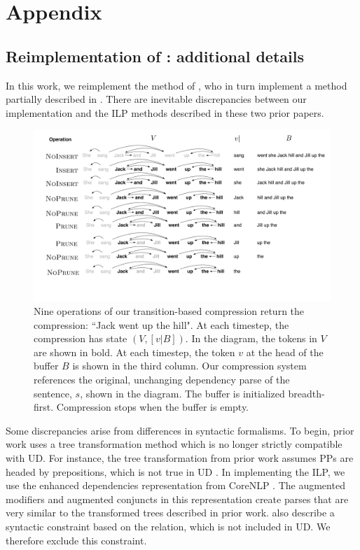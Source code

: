 
\section{Appendix}


\subsection{Reimplementation of \citet{filippova2013overcoming}: additional details}

In this work, we reimplement the method of \citet{filippova2013overcoming}, who in turn implement a method partially described in \citet{filippova2008dependency}.  There are inevitable discrepancies between our implementation and the ILP methods described in these two prior papers.  

\begin{figure}[htb!]
\centering
\includegraphics[width=.75\textwidth]{worked.pdf}
\caption{Nine operations of our transition-based compression return the compression: ``Jack went up the hill". At each timestep, the compression has state $(V, [v|B])$. In the diagram, the tokens in $V$ are shown in bold. At each timestep, the token $v$ at the head of the buffer $B$ is shown in the third column. Our compression system references the original, unchanging dependency parse of the sentence, $s$, shown in the diagram. The buffer is initialized breadth-first. Compression stops when the buffer is empty.}
\label{f:example}
\end{figure}

Some discrepancies arise from differences in syntactic formalisms. To begin, prior work uses a tree transformation method which is no longer strictly compatible with UD. For instance, the tree transformation from prior work assumes PPs are headed by prepositions, which is not true in UD \cite{Schuster2016EnhancedEU}. In implementing the ILP, we use the enhanced dependencies representation from CoreNLP \cite{Schuster2016EnhancedEU}. The augmented modifiers and augmented conjuncts in this representation create parses that are very similar to the transformed trees described in prior work. \citet{filippova2008dependency} also describe a syntactic constraint based on the  relation, which is not included in UD. We therefore exclude this constraint.

